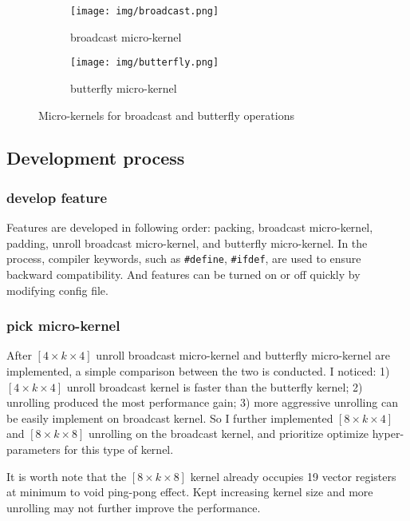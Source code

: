 \documentclass[12pt]{article}
\begin{document}
\begin{figure}[H]
    \centering
    \begin{subfigure}[b]{0.4\textwidth}
        \texttt{[image: img/broadcast.png]} %
        \caption{broadcast micro-kernel}
        \label{fig:broadcast}
    \end{subfigure}
    \hfill %
    \begin{subfigure}[b]{0.4\textwidth}
        \texttt{[image: img/butterfly.png]} %
        \caption{butterfly micro-kernel}
        \label{fig:butterfly}
    \end{subfigure}
    \caption{Micro-kernels for broadcast and butterfly operations}
    \label{fig:micro-kernels}
\end{figure}

\subsection{Development process}

\subsubsection{develop feature}
Features are developed in following order: 
packing, broadcast micro-kernel, padding, unroll broadcast micro-kernel, and butterfly micro-kernel.
In the process, compiler keywords, 
such as \texttt{\#define}, \texttt{\#ifdef}, are used
to ensure backward compatibility. 
And features can be turned on or off quickly by modifying config file.

\subsubsection{pick micro-kernel}
After $[4 \times k \times 4]$ unroll broadcast micro-kernel and butterfly micro-kernel are implemented,
a simple comparison between the two is conducted.
I noticed: 
1) $[4 \times k \times 4]$ unroll broadcast kernel is faster than the butterfly kernel;
2) unrolling produced the most performance gain; 
3) more aggressive unrolling can be easily implement on broadcast kernel.
So I further implemented $[8 \times k \times 4]$ and $[8 \times k \times 8]$ unrolling on the broadcast kernel,
and prioritize optimize hyper-parameters for this type of kernel.

It is worth note that the $[8\times k \times 8]$ kernel already 
occupies 19 vector registers at minimum to void ping-pong effect.
Kept increasing kernel size and more unrolling may not further improve the performance.
\end{document}
